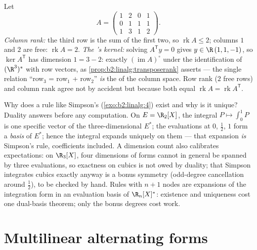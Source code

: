 \begin{example}\label{ex:b2:linalg:rankbothsides}
Let
\[
A = \begin{pmatrix}
1 & 2 & 0 & 1\\
0 & 1 & 1 & 1\\
1 & 3 & 1 & 2
\end{pmatrix} .
\]
\emph{Column rank:} the third row is the sum of the first two, so
$\operatorname{rk} A \leq 2$; columns $1$ and $2$ are free:
$\operatorname{rk} A = 2$. \emph{The 's kernel:} solving
$A^{\mathsf T}y = 0$ gives $y \in \R\,(1, 1, -1)$, so $\ker
A^{\mathsf T}$ has dimension $1 = 3 - 2$: exactly
$(\operatorname{im} A)^\circ$ under the identification of
$(\R^3)^*$ with row vectors, as
\cref{prop:b2:linalg:transposerank} asserts --- the single
relation ``row$_3$ = row$_1$ + row$_2$'' \emph{is} the
 of the column space. Row rank ($2$ free rows) and
column rank agree not by accident but because both equal
$\operatorname{rk} A = \operatorname{rk} A^{\mathsf T}$.
\end{example}

\begin{example}\label{ex:b2:linalg:quadratureread}
Why does a rule like Simpson's (\cref{exo:b2:linalg:4}) exist
and why is it unique? Duality answers before any computation.
On $E = \R_2[X]$, the integral $P \mapsto \int_0^1 P$ is one
specific vector of the three-dimensional  $E^*$; the
evaluations at $0$, $\frac12$, $1$ form a \emph{basis} of
$E^*$; hence the integral expands uniquely on them --- that
expansion \emph{is} Simpson's rule, coefficients included. A
dimension count also calibrates expectations: on $\R_3[X]$,
four dimensions of forms cannot in general be spanned by three
evaluations, so exactness on cubics is not owed by duality;
that Simpson integrates cubics exactly anyway is a bonus
symmetry (odd-degree cancellation around $\frac12$), to be
checked by hand. Rules with $n + 1$ nodes are expansions of the
integration form in an evaluation basis of $\R_n[X]^*$:
existence and uniqueness cost one dual-basis theorem; only the
bonus degrees cost work.
\end{example}

\section{Multilinear alternating forms}

